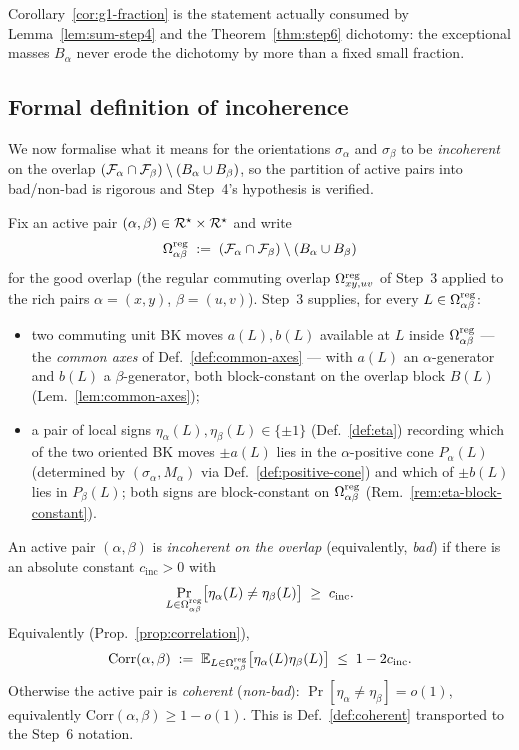 Corollary~\ref{cor:g1-fraction} is the statement actually consumed by
Lemma~\ref{lem:sum-step4} and the Theorem~\ref{thm:step6} dichotomy:
the exceptional masses $B_\alpha$ never erode the dichotomy by more
than a fixed small fraction.

\subsection{Formal definition of incoherence}\label{sec:gap-incoherence}

We now formalise what it means for the orientations $\sigma_\alpha$ and
$\sigma_\beta$ to be \emph{incoherent} on the overlap
$(\mathcal{F}_{\alpha}\cap\mathcal{F}_{\beta})\setminus(B_\alpha\cup B_\beta)$, so
the partition of active pairs into bad/non-bad is rigorous and
Step~4's hypothesis is verified.

Fix an active pair $(\alpha,\beta)\in\mathcal{R}^\star\times\mathcal{R}^\star$ and
write
\[
  \Omega^{\mathrm{reg}}_{\alpha\beta}
  \;:=\;(\mathcal{F}_{\alpha}\cap\mathcal{F}_{\beta})\setminus(B_\alpha\cup B_\beta)
\]
for the good overlap (the regular commuting overlap
$\Omega^{\mathrm{reg}}_{xy,uv}$ of Step~3 applied to the rich pairs
$\alpha=(x,y)$, $\beta=(u,v)$).
Step~3 supplies, for every $L\in\Omega^{\mathrm{reg}}_{\alpha\beta}$:
\begin{itemize}[nosep]
  \item two commuting unit BK moves $a(L),b(L)$ available at $L$ inside
  $\Omega^{\mathrm{reg}}_{\alpha\beta}$ --- the \emph{common axes} of
  Def.~\ref{def:common-axes} --- with $a(L)$ an $\alpha$-generator and
  $b(L)$ a $\beta$-generator, both block-constant on the overlap block
  $B(L)$ (Lem.~\ref{lem:common-axes});
  \item a pair of local signs
  $\eta_\alpha(L),\eta_\beta(L)\in\{\pm 1\}$
  (Def.~\ref{def:eta}) recording which of the two oriented BK moves
  $\pm a(L)$ lies in the $\alpha$-positive cone $P_\alpha(L)$ (determined
  by $(\sigma_\alpha,M_\alpha)$ via Def.~\ref{def:positive-cone}) and
  which of $\pm b(L)$ lies in $P_\beta(L)$; both signs are block-constant
  on $\Omega^{\mathrm{reg}}_{\alpha\beta}$ (Rem.~\ref{rem:eta-block-constant}).
\end{itemize}

\begin{definition}\label{def:incoherent-pair}
An active pair $(\alpha,\beta)$ is \emph{incoherent on the overlap}
(equivalently, \emph{bad}) if there is an absolute constant
$c_{\mathrm{inc}}>0$ with
\[
  \Pr_{L\in\Omega^{\mathrm{reg}}_{\alpha\beta}}
    \bigl[\eta_\alpha(L)\neq\eta_\beta(L)\bigr]
  \;\ge\;c_{\mathrm{inc}}.
\]
Equivalently (Prop.~\ref{prop:correlation}),
\[
  \mathrm{Corr}(\alpha,\beta)
  \;:=\;\mathbb{E}_{L\in\Omega^{\mathrm{reg}}_{\alpha\beta}}
         \bigl[\eta_\alpha(L)\eta_\beta(L)\bigr]
  \;\le\;1-2c_{\mathrm{inc}}.
\]
Otherwise the active pair is \emph{coherent} (\emph{non-bad}):
$\Pr[\eta_\alpha\neq\eta_\beta]=o(1)$, equivalently
$\mathrm{Corr}(\alpha,\beta)\ge 1-o(1)$.  This is
Def.~\ref{def:coherent} transported to the Step~6 notation.
\end{definition}

